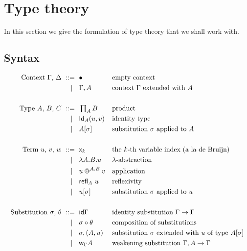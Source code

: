 \section{Type theory}
\label{sec:type-theory}

In this section we give the formulation of type theory that we shall work with.

\subsection{Syntax}
\label{sec:syntax}

\begin{align*}
  \text{Context $\Gamma$, $\Delta$}
    \ \mathrel{{:}{:}{=}}\    {}& \bullet                && \text{empty context} \\
    \ \mid\ \  {}& \Gamma, A       && \text{context $\Gamma$ extended with $A$} \\
  \\
  \text{Type $A$, $B$, $C$}
    \ \mathrel{{:}{:}{=}}\    {}& \mathop{\textstyle\prod_{A}} B             && \text{product}\\
    \ \mid\ \  {}& \mathsf{Id}_{A}(u,v)        && \text{identity type} \\
    \ \mid\ \  {}& A[\sigma]         && \text{substitution $\sigma$ applied to $A$} \\
  \\
  \text{Term $u$, $v$, $w$}
    \ \mathrel{{:}{:}{=}}\    {}& \mathsf{x}_{k}                  && \text{the $k$-th variable index (a la de Bruijn)} \\
    \ \mid\ \  {}& \lambda A . B . u         && \text{$\lambda$-abstraction} \\
    \ \mid\ \  {}& u\mathbin{@^{A.B}} v   && \text{application} \\
    \ \mid\ \  {}& {\mathsf{refl}_{A}}\  u            && \text{reflexivity} \\
    \ \mid\ \  {}& u[\sigma]        && \text{substitution $\sigma$ applied to $u$} \\
  \\
  \text{Substitution $\sigma$, $\theta$}
    \ \mathrel{{:}{:}{=}}\    {}& \mathsf{id}{\Gamma}                && \text{identity substitution $\Gamma \to \Gamma$} \\
    \ \mid\ \  {}& \sigma \circ \theta      && \text{composition of substitutions} \\
    \ \mid\ \  {}& \sigma,(A,u) && \text{substitution $\sigma$ extended with $u$ of type $A[\sigma]$} \\
    \ \mid\ \  {}& \mathsf{w}_{\Gamma}{A}          && \text{weakening substitution $\Gamma, A \to \Gamma$}
\end{align*}

